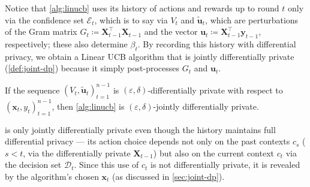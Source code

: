 \documentclass{article}
\renewcommand{\vec}[1]{\bm{#1}}
\newcommand{\defeq}{\coloneq}
\newcommand{\D}{\mathcal{D}}
\newcommand{\E}{\mathcal{E}}
\providecommand\transp{\top}
\let\transpsymbol\transp
\renewcommand{\transp}[1]{#1^\transpsymbol}
\newcommand{\XtX}[1]{\transp{#1}{#1}}
\begin{document}
Notice that \cref{alg:linucb} uses its history of actions and rewards
up to round $t$ only via the confidence set $\E_t$, which is to say
via $V_t$ and $\tilde{\vec u}_t$, which are perturbations of the Gram
matrix $G_t\defeq\XtX{\vec X_{t-1}}$ and the vector
$\vec u_t \defeq \transp{\vec X_{t-1}} \vec y_{t-1}$, respectively;
these also determine $\beta_t$.  By recording this history with
differential privacy, we obtain a Linear UCB algorithm that is jointly
differentially private (\cref{def:joint-dp}) because it simply
post-processes $G_t$ and $\vec u_t$.

\begin{claim}
  If the sequence $(V_t,\tilde{\vec u}_t)_{t=1}^{n-1}$ is
  $(\varepsilon,\delta)$-differentially private with respect to
  $(\vec x_t, y_t)_{t=1}^{n-1}$, then \cref{alg:linucb} is
  $(\varepsilon,\delta)$-jointly differentially private.
\end{claim}

\begin{remark}
   is only jointly differentially private even though
  the history maintains full differential privacy --- its action
  choice depends not only on the past contexts $c_s$ ($s < t$, via the
  differentially private $\vec X_{t-1}$) but also on the current
  context $c_t$ via the decision set $\D_t$.  Since this use of $c_t$
  is not differentially private, it is revealed by the algorithm's
  chosen $\vec x_t$ (as discussed in \cref{sec:joint-dp}).
\end{remark}
\end{document}
